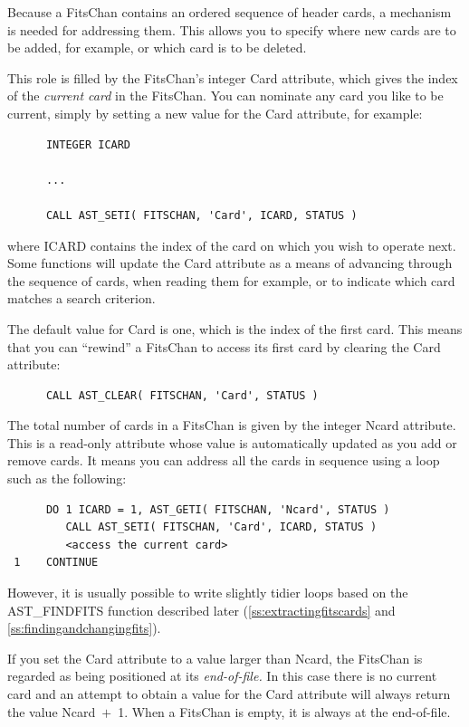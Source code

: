 \documentclass[twoside,11pt]{article}
\newcommand{\htmlref}[2]{#1}
\newcommand{\secref}[1]{\S\ref{#1}}
\renewcommand{\secref}[1]{\ref{#1}}
\begin{document}
Because a \htmlref{FitsChan}{FitsChan} contains an ordered sequence of header cards, a
mechanism is needed for addressing them. This allows you to specify
where new cards are to be added, for example, or which card is to be
deleted.

This role is filled by the FitsChan's integer \htmlref{Card}{Card} attribute, which
gives the index of the {\em{current card}} in the FitsChan.  You can
nominate any card you like to be current, simply by setting a new
value for the Card attribute, for example:

\small
\begin{verbatim}
      INTEGER ICARD

      ...

      CALL AST_SETI( FITSCHAN, 'Card', ICARD, STATUS )
\end{verbatim}
\normalsize

where ICARD contains the index of the card on which you wish to
operate next.  Some functions will update the Card attribute as a
means of advancing through the sequence of cards, when reading them
for example, or to indicate which card matches a search criterion.

The default value for Card is one, which is the index of the first
card. This means that you can ``rewind'' a FitsChan to access its
first card by clearing the Card attribute:

\small
\begin{verbatim}
      CALL AST_CLEAR( FITSCHAN, 'Card', STATUS )
\end{verbatim}
\normalsize

The total number of cards in a FitsChan is given by the integer \htmlref{Ncard}{Ncard}
attribute. This is a read-only attribute whose value is automatically
updated as you add or remove cards. It means you can address all the
cards in sequence using a loop such as the following:

\small
\begin{verbatim}
      DO 1 ICARD = 1, AST_GETI( FITSCHAN, 'Ncard', STATUS )
         CALL AST_SETI( FITSCHAN, 'Card', ICARD, STATUS )
         <access the current card>
 1    CONTINUE
\end{verbatim}
\normalsize

However, it is usually possible to write slightly tidier loops based
on the \htmlref{AST\_FINDFITS}{AST_FINDFITS} function described later
(\secref{ss:extractingfitscards} and
\secref{ss:findingandchangingfits}).

If you set the Card attribute to a value larger than Ncard, the
FitsChan is regarded as being positioned at its {\em{end-of-file.}} In
this case there is no current card and an attempt to obtain a value
for the Card attribute will always return the value Ncard~$+$~1. When
a FitsChan is empty, it is always at the end-of-file.
 
\end{document}
